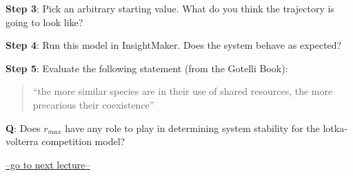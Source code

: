 \documentclass[
]{article}
\begin{document}
\textbf{Step 3}: Pick an arbitrary starting value. What do you think the
trajectory is going to look like?

\textbf{Step 4}: Run this model in InsightMaker. Does the system behave
as expected?

\textbf{Step 5}: Evaluate the following statement (from the Gotelli
Book):

\begin{quote}
``the more similar species are in their use of shared resources, the
more precarious their coexistence''
\end{quote}

\textbf{Q}: Does \(r_{max}\) have any role to play in determining system
stability for the lotka-volterra competition model?

\href{LECTURE17.html}{--go to next lecture--}
\end{document}

